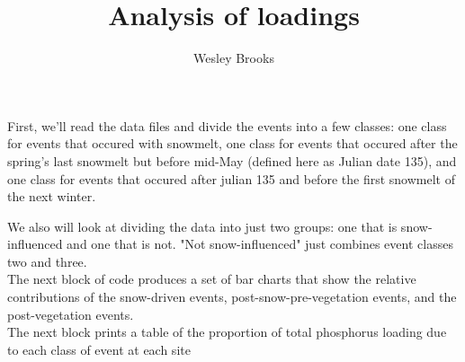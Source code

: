 \documentclass[12pt]{article}
\title{Analysis of loadings}
\author{Wesley Brooks}
\date{}                                           %
\begin{document}
\maketitle




First, we'll read the data files and divide the events into a few classes: one class for events that occured with snowmelt, one class for events that occured after the spring's last snowmelt but before mid-May (defined here as Julian date 135), and one class for events that occured after julian 135 and before the first snowmelt of the next winter. 

We also will look at dividing the data into just two groups: one that is snow-influenced and one that is not. "Not snow-influenced" just combines event classes two and three.\\











The next block of code produces a set of bar charts that show the relative contributions of the snow-driven events, post-snow-pre-vegetation events, and the post-vegetation events.\\







The next block prints a table of the proportion of total phosphorus loading due to each class of event at each site\\
\end{document}
